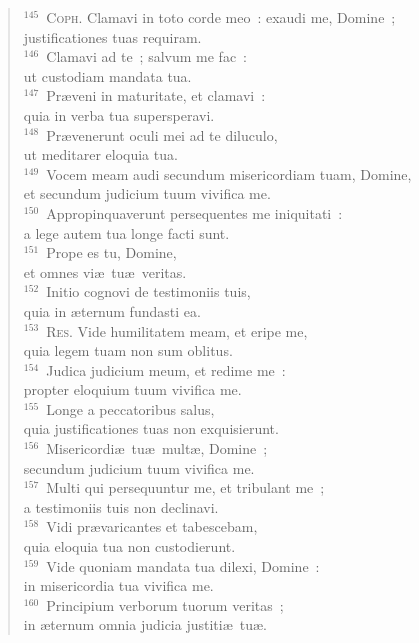 \begin{flushleft}
\begin{verse}
${}^{145}$~\textsc{Coph.} Clamavi in toto corde meo~: exaudi me, Domine~;\\ justificationes tuas requiram.\\
${}^{146}$~Clamavi ad te~; salvum me fac~:\\ ut custodiam mandata tua.\\
${}^{147}$~Pr\ae veni in maturitate, et clamavi~:\\ quia in verba tua supersperavi.\\
${}^{148}$~Pr\ae venerunt oculi mei ad te diluculo,\\ ut meditarer eloquia tua.\\
${}^{149}$~Vocem meam audi secundum misericordiam tuam, Domine,\\ et secundum judicium tuum vivifica me.\\
${}^{150}$~Appropinquaverunt persequentes me iniquitati~:\\ a lege autem tua longe facti sunt.\\
${}^{151}$~Prope es tu, Domine,\\ et omnes vi\ae\ tu\ae\ veritas.\\
${}^{152}$~Initio cognovi de testimoniis tuis,\\ quia in \ae ternum fundasti ea.\\
${}^{153}$~\textsc{Res.} Vide humilitatem meam, et eripe me,\\ quia legem tuam non sum oblitus.\\
${}^{154}$~Judica judicium meum, et redime me~:\\ propter eloquium tuum vivifica me.\\
${}^{155}$~Longe a peccatoribus salus,\\ quia justificationes tuas non exquisierunt.\\
${}^{156}$~Misericordi\ae\ tu\ae\ mult\ae , Domine~;\\ secundum judicium tuum vivifica me.\\
${}^{157}$~Multi qui persequuntur me, et tribulant me~;\\ a testimoniis tuis non declinavi.\\
${}^{158}$~Vidi pr\ae varicantes et tabescebam,\\ quia eloquia tua non custodierunt.\\
${}^{159}$~Vide quoniam mandata tua dilexi, Domine~:\\ in misericordia tua vivifica me.\\
${}^{160}$~Principium verborum tuorum veritas~;\\ in \ae ternum omnia judicia justiti\ae\ tu\ae .\\

\end{verse}
\end{flushleft}
